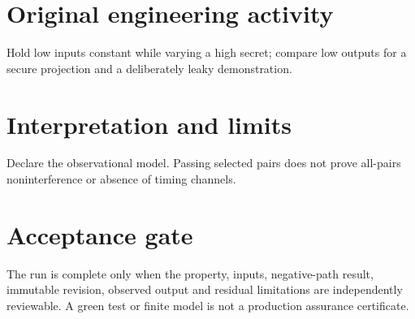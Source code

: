 \documentclass[10pt,letterpaper]{article}
\begin{document}
\section{Original engineering activity}
Hold low inputs constant while varying a high secret; compare low outputs for a secure projection and a deliberately leaky demonstration.
\section{Interpretation and limits}
Declare the observational model. Passing selected pairs does not prove all-pairs noninterference or absence of timing channels.
\section{Acceptance gate}
The run is complete only when the property, inputs, negative-path result, immutable revision, observed output and residual limitations are independently reviewable. A green test or finite model is not a production assurance certificate.
\end{document}
